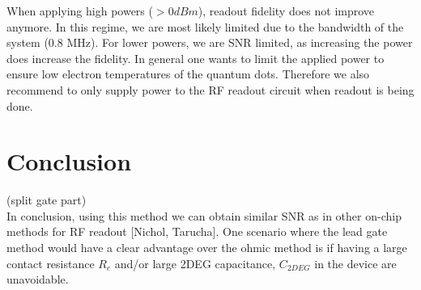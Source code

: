 \documentclass{article}
\begin{document}
When applying high powers ($>0dBm$), readout fidelity does not improve anymore. In this regime, we are most likely limited due to the bandwidth of the system (0.8 MHz). For lower powers, we are SNR limited, as increasing the power does increase the fidelity. In general one wants to limit the applied power to ensure low electron temperatures of the quantum dots. Therefore we also recommend to only supply power to the RF readout circuit when readout is being done. 

\section{Conclusion}
(split gate part) \\
In conclusion, using this method we can obtain similar SNR as in other on-chip methods for RF readout [Nichol, Tarucha]. One scenario where the lead gate method would have a clear advantage over the ohmic method is if having a large contact resistance $R_c$ and/or large 2DEG capacitance, $C_{2DEG}$ in the device are unavoidable.



\end{document}
